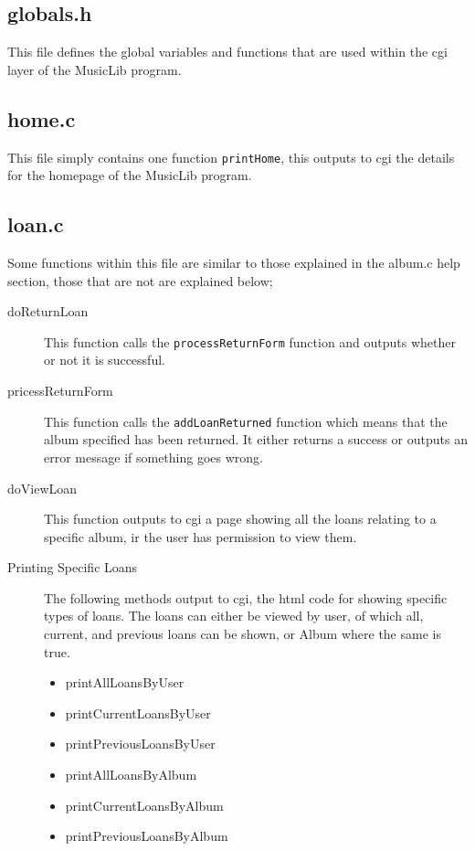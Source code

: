 \documentclass{article}
\begin{document}
\subsection{globals.h}
This file defines the global variables and functions that are used within the cgi layer of the MusicLib program.

\subsection{home.c}
This file simply contains one function \verb|printHome|, this outputs to cgi the details for the homepage of the MusicLib program.

\subsection{loan.c}
Some functions within this file are similar to those explained in the album.c help section, those that are not are explained below;
\begin{description}
\item[doReturnLoan] This function calls the \verb|processReturnForm| function and outputs whether or not it is successful.
\item[pricessReturnForm] This function calls the \verb|addLoanReturned| function which means that the album specified has been returned. It either returns a success or outputs an error message if something goes wrong.
\item[doViewLoan] This function outputs to cgi a page showing all the loans relating to a specific album, ir the user has permission to view them.

\item[Printing Specific Loans] The following methods output to cgi, the html code for showing specific types of loans. The loans can either be viewed by user, of which all, current, and previous loans can be shown, or Album where the same is true.
\begin{itemize}
\item{printAllLoansByUser}
\item{printCurrentLoansByUser}
\item{printPreviousLoansByUser}
\item{printAllLoansByAlbum}
\item{printCurrentLoansByAlbum}
\item{printPreviousLoansByAlbum}
\end{itemize}
\end{description}
\end{document}
